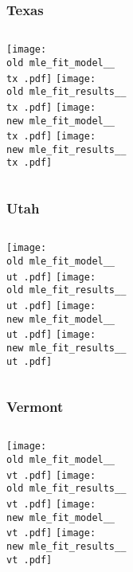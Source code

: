 \documentclass{beamer}
\newcommand{\old}{api-370-prod/pyseir/state_summaries/reports/}
\newcommand{\new}{new/pyseir/state_summaries/reports/}
\newcommand{\tx}{Texas__48}
\newcommand{\ut}{Utah__49}
\newcommand{\vt}{Vermont__50}
\begin{document}
\begin{frame}
\frametitle{Texas}
    \begin{columns}[t]
       \texttt{[image: \\old mle\_fit\_model\_\_\\tx .pdf]}
       \texttt{[image: \\old mle\_fit\_results\_\_\\tx .pdf]}   
       \texttt{[image: \\new mle\_fit\_model\_\_\\tx .pdf]}
       \texttt{[image: \\new mle\_fit\_results\_\_\\tx .pdf]}   
\end{columns}
\end{frame}

\begin{frame}
\frametitle{Utah}
    \begin{columns}[t]
       \texttt{[image: \\old mle\_fit\_model\_\_\\ut .pdf]}
       \texttt{[image: \\old mle\_fit\_results\_\_\\ut .pdf]}   
       \texttt{[image: \\new mle\_fit\_model\_\_\\ut .pdf]}
       \texttt{[image: \\new mle\_fit\_results\_\_\\ut .pdf]}   
\end{columns}
\end{frame}

\begin{frame}
\frametitle{Vermont}
    \begin{columns}[t]
       \texttt{[image: \\old mle\_fit\_model\_\_\\vt .pdf]}
       \texttt{[image: \\old mle\_fit\_results\_\_\\vt .pdf]}   
       \texttt{[image: \\new mle\_fit\_model\_\_\\vt .pdf]}
       \texttt{[image: \\new mle\_fit\_results\_\_\\vt .pdf]}   
\end{columns}
\end{frame}
\end{document}
